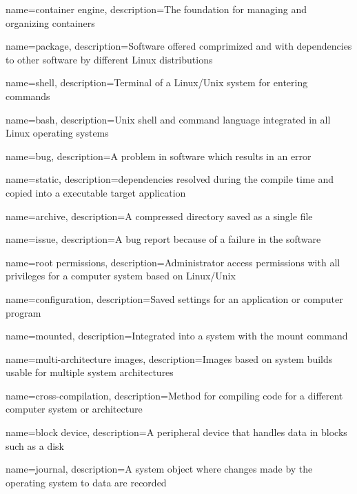 {
    name={container engine},
    description={The foundation for managing and organizing containers}
}

{
    name={package},
    description={Software offered comprimized and with dependencies to other software by different Linux distributions}
}

{
    name={shell},
    description={Terminal of a Linux/Unix system for entering commands}
}

{
    name={bash},
    description={Unix shell and command language integrated in all Linux operating systems}
}

{
    name={bug},
    description={A problem in software which results in an error}
}

{
    name={static},
    description={dependencies resolved during the compile time and copied into a executable target application}
}

{
    name={archive},
    description={A compressed directory saved as a single file}
}

{
    name={issue},
    description={A bug report because of a failure in the software}
}

{
    name={root permissions},
    description={Administrator access permissions with all privileges for a computer system based on Linux/Unix}
}

{
    name={configuration},
    description={Saved settings for an application or computer program}
}

{
    name={mounted},
    description={Integrated into a system with the mount command}
}

{
    name={multi-architecture images},
    description={Images based on system builds usable for multiple system architectures}
}

{
    name={cross-compilation},
    description={Method for compiling code for a different computer system or architecture}
}

{
    name={block device},
    description={A peripheral device that handles data in blocks such as a disk}
}

{
    name={journal},
    description={A system object where changes made by the operating system to data are recorded}
}

